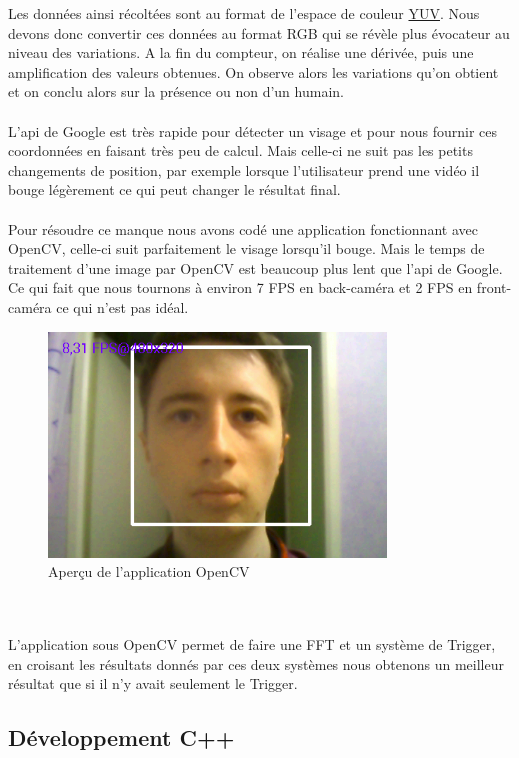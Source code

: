 Les données ainsi récoltées sont au format de l'espace de couleur \href{http://fr.wikipedia.org/wiki/YUV}{YUV}. Nous devons donc convertir ces données au format RGB qui se révèle plus évocateur au niveau des variations. 
	A la fin du compteur, on réalise une dérivée, puis une amplification des valeurs obtenues. On observe alors les variations qu'on obtient et on conclu alors sur la présence ou non d'un humain.
	\\
	\\
	L'api de Google est très rapide pour détecter un visage et pour nous fournir ces coordonnées en faisant très peu de calcul. Mais celle-ci ne suit pas les petits changements de position, par exemple lorsque l'utilisateur prend une vidéo il bouge légèrement ce qui peut changer le résultat final.
	\\
	\\
	Pour résoudre ce manque nous avons codé une application fonctionnant avec OpenCV, celle-ci suit parfaitement le visage lorsqu'il bouge. Mais le temps de traitement d'une image par OpenCV est beaucoup plus lent que l'api de Google. Ce qui fait que nous tournons à environ 7 FPS en back-caméra et 2 FPS en front-caméra ce qui n'est pas idéal.
	\begin{figure}[h!]
			\centering
			\includegraphics[width=0.8\textwidth]{data/opencv.png}
			\caption{Aperçu de l'application OpenCV}
		\end{figure}
	\\
	\\
	L'application sous OpenCV permet de faire une FFT et un système de Trigger, en croisant les résultats donnés par ces deux systèmes nous obtenons un meilleur résultat que si il n'y avait seulement le Trigger.  

\subsection{Développement C++}

